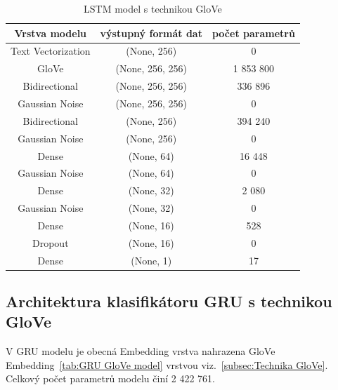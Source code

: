 \begin{table}[H]
	\centering
	\caption{LSTM model s technikou GloVe }\label{tab:LSTM GloVe model}
	\begin{tabular}{ c c c }
			\toprule
			Vrstva modelu & výstupný formát dat & počet parametrů\\
			\midrule
            Text Vectorization & (None, 256) & 0\\         
            GloVe & (None, 256, 256) & 1 853 800\\   
            Bidirectional & (None, 256, 256) & 336 896\\    
			Gaussian Noise & (None, 256, 256) & 0\\
            Bidirectional & (None, 256) & 394 240\\
			Gaussian Noise & (None, 256) & 0\\
            Dense & (None, 64) & 16 448\\ 
			Gaussian Noise & (None, 64) & 0\\
			Dense & (None, 32) & 2 080\\ 
			Gaussian Noise & (None, 32) & 0\\
			Dense & (None, 16) & 528\\ 
            Dropout & (None, 16) & 0\\   
            Dense & (None, 1) & 17\\ 
			\midrule
		\end{tabular}
\end{table}

\subsection{Architektura klasifikátoru GRU s technikou GloVe}\label{arch: GRU GloVe}
V GRU modelu je obecná Embedding vrstva nahrazena GloVe Embedding~\ref{tab:GRU GloVe model} vrstvou viz.~\ref{subsec:Technika GloVe}.
Celkový počet parametrů modelu činí 2 422 761.

